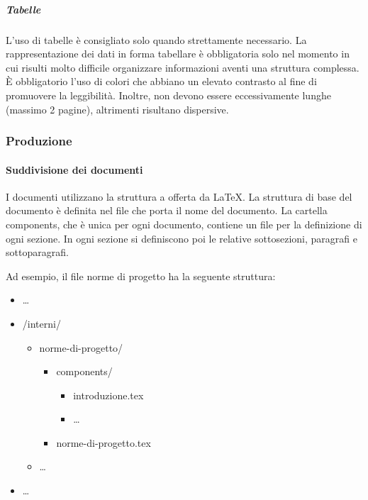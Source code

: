 \documentclass[../norme-di-progetto.tex]{subfiles}
\begin{document}
\subparagraph{Tabelle}%
\label{subp:tabelle}
L'uso di tabelle è consigliato solo quando strettamente necessario. La rappresentazione dei dati in forma tabellare è obbligatoria solo nel momento in cui risulti molto difficile organizzare informazioni aventi una struttura complessa. È obbligatorio l'uso di colori che abbiano un elevato contrasto al fine di promuovere la leggibilità. Inoltre, non devono essere eccessivamente lunghe (massimo 2 pagine), altrimenti risultano dispersive.

\subsubsection{Produzione}%
\label{subs:produzione}

\paragraph{Suddivisione dei documenti}%
\label{par:suddivisione_dei_documenti}
I documenti utilizzano la struttura a  offerta da \LaTeX.
La struttura di base del documento è definita nel file che porta il nome del documento.
La cartella components, che è unica per ogni documento, contiene un file per la definizione di ogni sezione. In ogni sezione si definiscono poi le relative sottosezioni, paragrafi e sottoparagrafi.

Ad esempio, il file norme di progetto ha la seguente struttura:

\begin{itemize}
  \item[] \ldots
  \item[] /interni/
        \begin{itemize}
          \item[] norme-di-progetto/
                \begin{itemize}
                  \item[] components/
                        \begin{itemize}
                          \item[] introduzione.tex
                          \item[] \ldots
                        \end{itemize}
                  \item[] norme-di-progetto.tex
                \end{itemize}
          \item[] \ldots
        \end{itemize}
  \item[] \ldots
\end{itemize}
\end{document}
